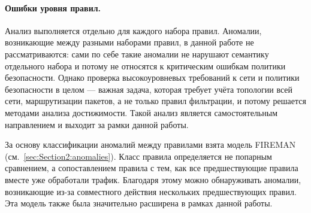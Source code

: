 \paragraph{Ошибки уровня правил.} Анализ выполняется отдельно для каждого набора правил. Аномалии, возникающие между разными наборами правил, в данной работе не рассматриваются: сами по себе такие аномалии не нарушают семантику отдельного набора и потому не относятся к критическим ошибкам политики безопасности. Однако проверка высокоуровневых требований к сети и политики безопасности в целом --- важная задача, которая требует учёта топологии всей сети, маршрутизации пакетов, а не только правил фильтрации, и потому решается методами анализа достижимости. Такой анализ является самостоятельным направлением и выходит за рамки данной работы.

За основу классификации аномалий между правилами взята модель FIREMAN~\cite{yuan2006fireman} (см.~\ref{sec:Section2:anomalies}). Класс правила определяется не попарным сравнением, а сопоставлением правила с тем, как все предшествующие правила вместе уже обработали трафик. Благодаря этому можно обнаруживать аномалии, возникающие из-за совместного действия нескольких предшествующих правил. Эта модель также была значительно расширена в рамках данной работы.

